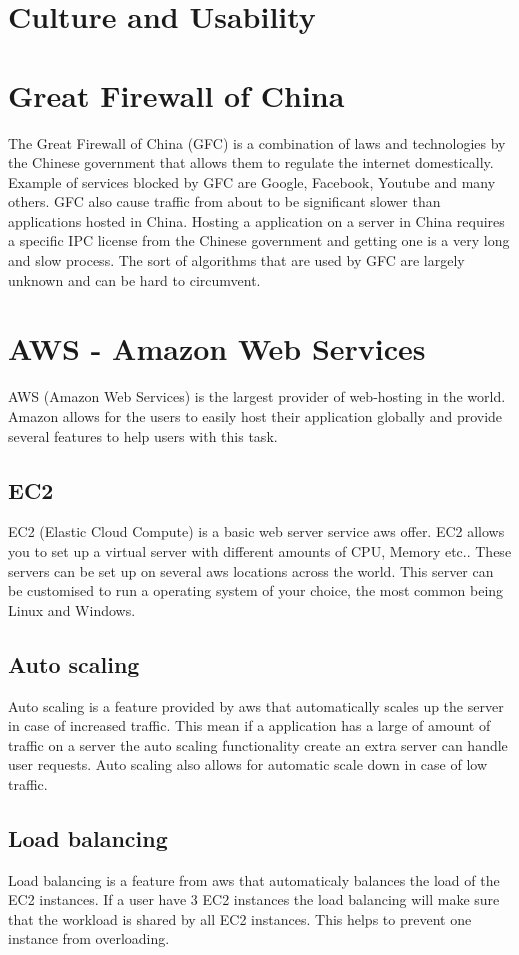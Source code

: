 \section{Culture and Usability}

\section{Great Firewall of China}
The Great Firewall of China (GFC) is a combination of laws and technologies by the Chinese government that allows them to regulate the internet domestically. Example of services blocked by GFC are Google, Facebook, Youtube and many others. GFC also cause traffic from about to be significant slower than applications hosted in China. Hosting a application on a server in China requires a specific IPC license from the Chinese government and getting one is a very long and slow process. The sort of algorithms that are used by GFC are largely unknown and can be hard to circumvent.

\section{AWS - Amazon Web Services}
AWS (Amazon Web Services) is the largest provider of web-hosting in the world. Amazon allows for the users to easily host their application globally and provide several features to help users with this task.
\subsection{EC2}
EC2 (Elastic Cloud Compute) is a basic web server service aws offer. EC2 allows you to set up a virtual server with different amounts of CPU, Memory etc.. These servers can be set up on several aws locations across the world. This server can be customised to run a operating system of your choice, the most common being Linux and Windows.
\subsection{Auto scaling}
Auto scaling is a feature provided by aws that automatically scales up the server in case of increased traffic. This mean if a application has a large of amount of traffic on a server the auto scaling functionality create an extra server can handle user requests. Auto scaling also allows for automatic scale down in case of low traffic. 
\subsection{Load balancing}
Load balancing is a feature from aws that automaticaly balances the load of the EC2 instances. If a user have 3 EC2 instances the load balancing will make sure that the workload is shared by all EC2 instances. This helps to prevent one instance from overloading.
